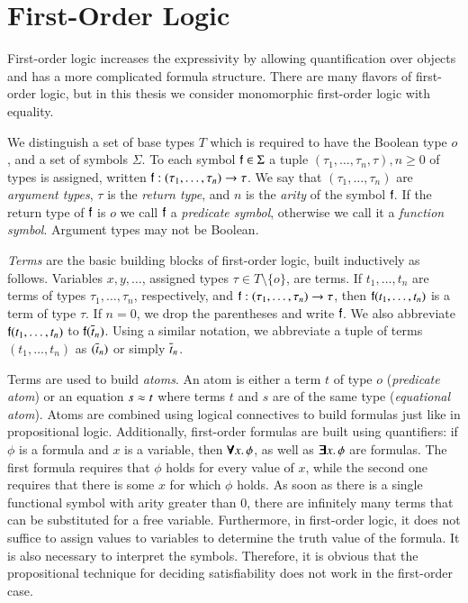 \section{First-Order Logic}
\label{sec:pre:fol}

First-order logic increases the expressivity by allowing quantification over
objects and has a more complicated formula structure. There are many flavors of
first-order logic, but in this thesis we consider monomorphic first-order logic
with equality.

We distinguish a set of base types $T$ which is required to have the Boolean
type $o$, and a set of symbols $\Sigma$. To each symbol $\mathsf{f} \in \Sigma$ a
tuple $(\tau_1, \ldots, \tau_{n}, \tau), n \geq 0$ of types is assigned, written
$\mathsf{f} : (\tau_1, \ldots, \tau_{n}) \rightarrow \tau$. We say that $(\tau_1,
\ldots, \tau_{n})$ are \emph{argument types}, $\tau$ is the \emph{return type}, and $n$
is the \emph{arity} of the symbol $\mathsf{f}$. If the return type of $\mathsf{f}$ is $o$ we call
$\mathsf{f}$ a \emph{predicate symbol}, otherwise we call it a \emph{function symbol}. Argument types may not be Boolean.

\emph{Terms} are the basic building blocks of first-order logic, built inductively as follows. Variables
$x,y,\ldots$, assigned types $\tau \in T\setminus \{ o \}$, are terms. If $t_1,\ldots,t_n$ are
terms of types $\tau_1, \ldots, \tau_n$, respectively, and $\mathsf{f} : (\tau_1,
\ldots, \tau_{n}) \rightarrow \tau$, then $\mathsf{f}(t_1, \ldots, t_n)$ is a term
of type $\tau$. If $n=0$, we drop the parentheses and write $\mathsf{f}$. We also
abbreviate $\mathsf{f}(t_1, \ldots, t_n)$ to $\mathsf{f}(\overline{t}_{n})$. Using a similar
notation, we abbreviate a tuple of terms $(t_1, \ldots, t_n)$ as $(\overline{t}_{n})$
or simply $\overline{t}_{n}$.

Terms are used to build \emph{atoms}. An atom is either a term $t$ of type $o$ (\emph{predicate atom}) or an
equation $s \approx t$ where terms $t$ and $s$ are of the same type (\emph{equational atom}). Atoms are
combined using logical connectives to build formulas just like in propositional
logic. Additionally, first-order formulas are built using quantifiers: if $\phi$
is a formula and $x$ is a variable, then $\pmb{\forall} x.\, \phi$, as well as
$\pmb{\exists} x.\, \phi$ are formulas. The first formula requires that $\phi$ holds
for every value of $x$, while the second one requires that there is some $x$ for
which $\phi$ holds. As soon as there is a single functional symbol with arity
greater than 0, there are infinitely many terms that can be substituted for a
free variable. Furthermore, in first-order logic, it does not suffice to assign
values to variables to determine the truth value of the formula. It is also
necessary to interpret the symbols. Therefore, it is obvious that the propositional
technique for deciding satisfiability does not work in the first-order case.

